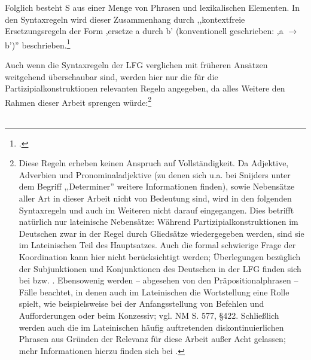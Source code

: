 \documentclass[12pt,a4paper]{article}
\begin{document}
Folglich besteht S aus einer Menge von Phrasen und lexikalischen Elementen. In den Syntaxregeln wird dieser Zusammenhang durch ,,kontextfreie Ersetzungsregeln der Form ,ersetze a durch b' (konventionell geschrieben: ,a $\rightarrow$ b')'' beschrieben.\footnote{\cite[18]{Rohrer}.}

Auch wenn die Syntaxregeln der LFG verglichen mit früheren Ansätzen weitgehend überschaubar sind, werden hier nur die für die Partizipialkonstruktionen relevanten Regeln angegeben, da alles Weitere den Rahmen dieser Arbeit sprengen würde:\footnote{Diese Regeln erheben keinen Anspruch auf Vollständigkeit. Da Adjektive, Adverbien und Pronominaladjektive (zu denen sich u.a. bei Snijders unter dem Begriff ,,Determiner'' weitere Informationen finden), sowie Nebensätze aller Art  in dieser Arbeit nicht von Bedeutung sind, wird in den folgenden Syntaxregeln und auch im Weiteren nicht darauf eingegangen. Dies betrifft natürlich nur lateinische Nebensätze: Während Partizipialkonstruktionen im Deutschen zwar in der Regel durch Gliedsätze wiedergegeben werden, sind sie im Lateinischen Teil des Hauptsatzes. Auch die formal schwierige Frage der Koordination kann hier nicht berücksichtigt werden; Überlegungen bezüglich der Subjunktionen und Konjunktionen des Deutschen in der LFG finden sich bei \cite[103-119]{Skript} bzw. \cite[120-136]{Skript}. Ebensowenig werden -- abgesehen von den Präpositionalphrasen -- Fälle beachtet, in denen auch im Lateinischen die Wortstellung eine Rolle spielt, wie beispielsweise bei der Anfangsstellung von Befehlen und Aufforderungen oder beim Konzessiv; vgl. NM S. 577, §422. Schließlich werden auch die im Lateinischen häufig auftretenden diskontinuierlichen Phrasen aus Gründen der Relevanz für diese Arbeit außer Acht gelassen; mehr Informationen hierzu finden sich bei \cite{Snijders}.} 
\\
\\
\end{document}
